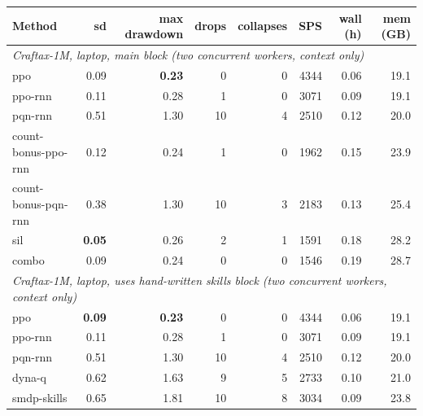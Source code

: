 \begin{tabular}{lrrrrrrr}
\toprule
Method & sd & max drawdown & drops & collapses & SPS & wall (h) & mem (GB) \\
\midrule
\multicolumn{8}{l}{\emph{Craftax-1M, laptop, main block (two concurrent workers, context only)}} \\
ppo & 0.09 & \textbf{0.23} & 0 & 0 & 4344 & 0.06 & 19.1 \\
ppo-rnn & 0.11 & 0.28 & 1 & 0 & 3071 & 0.09 & 19.1 \\
pqn-rnn & 0.51 & 1.30 & 10 & 4 & 2510 & 0.12 & 20.0 \\
count-bonus-ppo-rnn & 0.12 & 0.24 & 1 & 0 & 1962 & 0.15 & 23.9 \\
count-bonus-pqn-rnn & 0.38 & 1.30 & 10 & 3 & 2183 & 0.13 & 25.4 \\
sil & \textbf{0.05} & 0.26 & 2 & 1 & 1591 & 0.18 & 28.2 \\
combo & 0.09 & 0.24 & 0 & 0 & 1546 & 0.19 & 28.7 \\
\midrule
\multicolumn{8}{l}{\emph{Craftax-1M, laptop, uses hand-written skills block (two concurrent workers, context only)}} \\
ppo & \textbf{0.09} & \textbf{0.23} & 0 & 0 & 4344 & 0.06 & 19.1 \\
ppo-rnn & 0.11 & 0.28 & 1 & 0 & 3071 & 0.09 & 19.1 \\
pqn-rnn & 0.51 & 1.30 & 10 & 4 & 2510 & 0.12 & 20.0 \\
dyna-q & 0.62 & 1.63 & 9 & 5 & 2733 & 0.10 & 21.0 \\
smdp-skills & 0.65 & 1.81 & 10 & 8 & 3034 & 0.09 & 23.8 \\
\bottomrule
\end{tabular}
